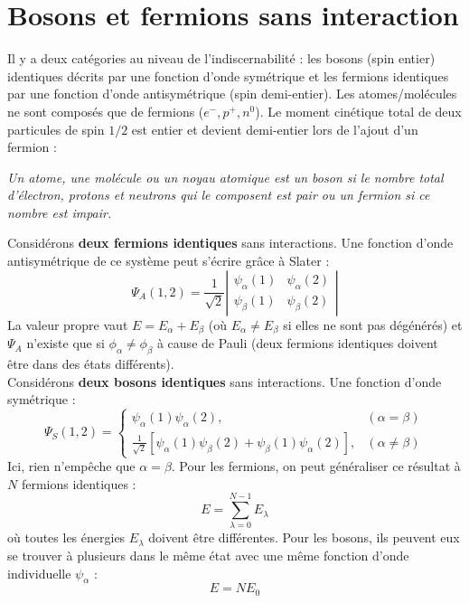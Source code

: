 \documentclass	[11pt, a4paper, openany]{book}
\begin{document}
\section{Bosons et fermions sans interaction}
Il y a deux catégories au niveau de l'indiscernabilité : les bosons (spin entier) identiques décrits par 
une fonction d'onde symétrique et les fermions identiques par une fonction d'onde antisymétrique (spin 
demi-entier). Les atomes/molécules ne sont composés que de fermions ($e^-,p^+,n^0$). Le moment cinétique
total de deux particules de spin $1/2$ est entier et devient demi-entier lors de l'ajout d'un fermion :
\begin{center}
\textit{Un atome, une molécule ou un noyau atomique est un boson si le nombre total d'électron, protons 
et neutrons qui le composent est pair ou un fermion si ce nombre est impair.}
\end{center}
Considérons \textbf{deux fermions identiques} sans interactions. Une fonction d'onde antisymétrique de
ce système peut s'écrire grâce à Slater :
\begin{equation}
\Psi_A(1,2) = \frac{1}{\sqrt{2}}\left|\begin{array}{cc}
\psi_\alpha(1) & \psi_\alpha(2)\\
\psi_\beta(1) & \psi_\beta(2)
\end{array}\right|
\end{equation}
La valeur propre vaut $E = E_\alpha + E_\beta$ (où $E_\alpha \neq E_\beta$ si elles ne sont pas dégénérés) 
et $\Psi_A$ n'existe que si $\phi_\alpha\neq\phi_\beta$ à cause de Pauli (deux fermions identiques doivent 
être dans des états différents).\\
Considérons \textbf{deux bosons identiques} sans interactions. Une fonction d'onde symétrique :
\begin{equation}
\Psi_S(1,2) = \left\{\begin{array}{ll}
\psi_\alpha(1)\psi_\alpha(2), & (\alpha=\beta)\\
\frac{1}{\sqrt{2}}[\psi_\alpha(1)\psi_\beta(2) + \psi_\beta(1)\psi_\alpha(2)], & (\alpha\neq\beta)
\end{array}\right.
\end{equation}
Ici, rien n'empêche que $\alpha = \beta$. Pour les fermions, on peut généraliser ce résultat à $N$ fermions 
identiques :
\begin{equation}
E = \sum_{\lambda=0}^{N-1} E_\lambda
\end{equation}
où toutes les énergies $E_\lambda$ doivent être différentes. Pour les bosons, ils peuvent eux se trouver
à plusieurs dans le même état avec une même fonction d'onde individuelle $\psi_\alpha$ :
\begin{equation}
E = NE_0
\end{equation}
\end{document}
